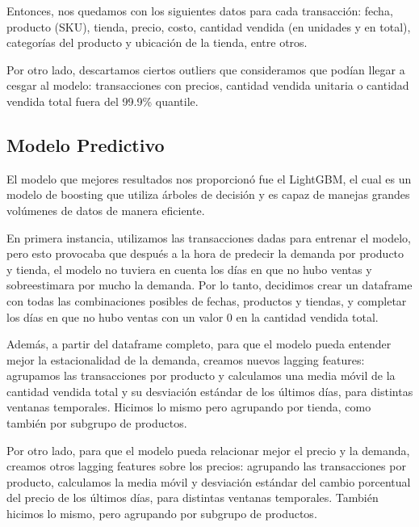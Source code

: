 \documentclass[12pt,a4paper]{article}
\begin{document}
\vspace{0.2cm}

Entonces, nos quedamos con los siguientes datos para cada transacción: fecha, producto (SKU), tienda, 
precio, costo, cantidad vendida (en unidades y en total), categorías del producto y ubicación de la tienda, entre otros.

\vspace{0.2cm}

Por otro lado, descartamos ciertos outliers que consideramos que podían llegar a cesgar al modelo: transacciones con precios, 
cantidad vendida unitaria o cantidad vendida total fuera del 99.9\% quantile.



\subsection{Modelo Predictivo}

El modelo que mejores resultados nos proporcionó fue el LightGBM, el cual es un modelo de boosting que utiliza árboles de decisión y 
es capaz de manejas grandes volúmenes de datos de manera eficiente.

\vspace{0.2cm}

En primera instancia, utilizamos las transacciones dadas para entrenar el modelo, pero esto provocaba que después a la hora de 
predecir la demanda por producto y tienda, el modelo no tuviera en cuenta los días en que no hubo ventas y sobreestimara por mucho 
la demanda. Por lo tanto, decidimos crear un dataframe con todas las combinaciones posibles de fechas, productos y tiendas, y completar 
los días en que no hubo ventas con un valor 0 en la cantidad vendida total.

\vspace{0.2cm}

Además, a partir del dataframe completo, para que el modelo pueda entender mejor la estacionalidad de la demanda, 
creamos nuevos lagging features: agrupamos las transacciones por producto y calculamos 
una media móvil de la cantidad vendida total y su desviación estándar de los últimos días, para distintas ventanas temporales. 
Hicimos lo mismo pero agrupando por tienda, como también por subgrupo de productos.

\vspace{0.2cm}

Por otro lado, para que el modelo pueda relacionar mejor el precio y la demanda, creamos otros lagging features sobre los precios: 
agrupando las transacciones por producto, calculamos la media móvil y desviación estándar del cambio porcentual del precio de los 
últimos días, para distintas ventanas temporales. También hicimos lo mismo, pero agrupando por subgrupo de productos.
\end{document}
